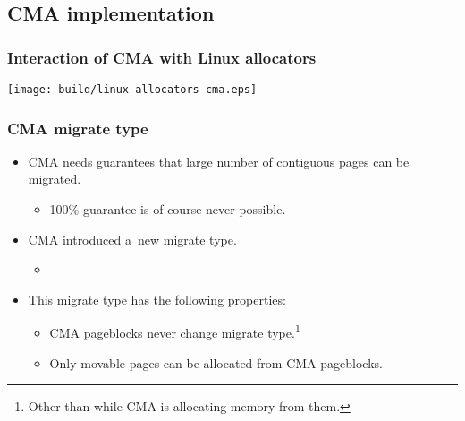 
\subsection{CMA implementation}

\begin{frame}[fragile]
  \frametitle{Interaction of CMA with Linux allocators}

  \begin{center}
    \texttt{[image: build/linux-allocators--cma.eps]}
  \end{center}
\end{frame}

\begin{frame}
  \frametitle{CMA migrate type}

  \begin{itemize}
  \item CMA needs guarantees that large number of contiguous pages can
    be migrated.
    \begin{itemize}
    \item 100\% guarantee is of course never possible.
    \end{itemize}
  \end{itemize}

  \begin{itemize}
  \item CMA introduced a~new migrate type.
    \begin{itemize}
    \item {}
    \end{itemize}
  \item This migrate type has the following properties:
    \begin{itemize}
    \item CMA pageblocks never change migrate type.\footnote{Other
      than while CMA is allocating memory from them.}
    \item Only movable pages can be allocated from CMA pageblocks.
    \end{itemize}
  \end{itemize}
\end{frame}

